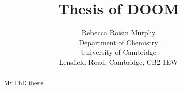 \documentclass[12pt]{report}
\begin{document}
\title{Thesis of DOOM}

\author{Rebecca Roisin Murphy \\ 
Department of Chemistry \\
University of Cambridge \\
Lensfield Road, Cambridge, CB2 1EW}

\maketitle

\begin{abstract}
  My PhD thesis.
\end{abstract}

\tableofcontents










\nocite{*}



\end{document}
